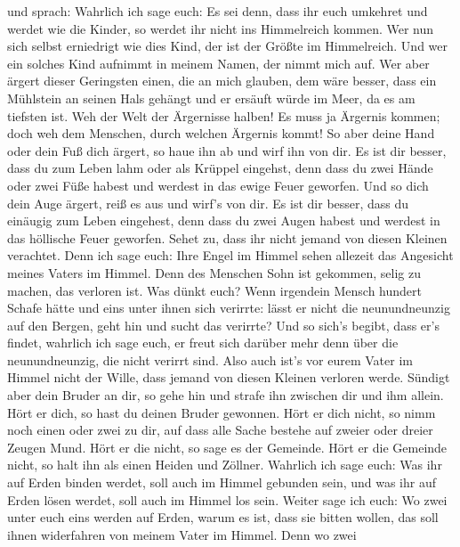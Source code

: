  und sprach: Wahrlich ich sage euch: Es sei denn, dass ihr
euch umkehret und werdet wie die Kinder, so werdet ihr nicht ins
Himmelreich kommen.  Wer nun sich selbst erniedrigt wie dies
Kind, der ist der Größte im Himmelreich.  Und wer ein
solches Kind aufnimmt in meinem Namen, der nimmt mich auf. 
Wer aber ärgert dieser Geringsten einen, die an mich glauben, dem wäre
besser, dass ein Mühlstein an seinen Hals gehängt und er ersäuft würde
im Meer, da es am tiefsten ist.  Weh der Welt der Ärgernisse
halben! Es muss ja Ärgernis kommen; doch weh dem Menschen, durch welchen
Ärgernis kommt!  So aber deine Hand oder dein Fuß dich
ärgert, so haue ihn ab und wirf ihn von dir. Es ist dir besser, dass du
zum Leben lahm oder als Krüppel eingehst, denn dass du zwei Hände oder
zwei Füße habest und werdest in das ewige Feuer geworfen. 
Und so dich dein Auge ärgert, reiß es aus und wirf's von dir. Es ist dir
besser, dass du einäugig zum Leben eingehest, denn dass du zwei Augen
habest und werdest in das höllische Feuer geworfen.  Sehet
zu, dass ihr nicht jemand von diesen Kleinen verachtet. Denn ich sage
euch: Ihre Engel im Himmel sehen allezeit das Angesicht meines Vaters im
Himmel.  Denn des Menschen Sohn ist gekommen, selig zu
machen, das verloren ist.  Was dünkt euch? Wenn irgendein
Mensch hundert Schafe hätte und eins unter ihnen sich verirrte: lässt er
nicht die neunundneunzig auf den Bergen, geht hin und sucht das
verirrte?  Und so sich's begibt, dass er's findet, wahrlich
ich sage euch, er freut sich darüber mehr denn über die neunundneunzig,
die nicht verirrt sind.  Also auch ist's vor eurem Vater im
Himmel nicht der Wille, dass jemand von diesen Kleinen verloren werde.
 Sündigt aber dein Bruder an dir, so gehe hin und strafe
ihn zwischen dir und ihm allein. Hört er dich, so hast du deinen Bruder
gewonnen.  Hört er dich nicht, so nimm noch einen oder zwei
zu dir, auf dass alle Sache bestehe auf zweier oder dreier Zeugen Mund.
 Hört er die nicht, so sage es der Gemeinde. Hört er die
Gemeinde nicht, so halt ihn als einen Heiden und Zöllner. 
Wahrlich ich sage euch: Was ihr auf Erden binden werdet, soll auch im
Himmel gebunden sein, und was ihr auf Erden lösen werdet, soll auch im
Himmel los sein.  Weiter sage ich euch: Wo zwei unter euch
eins werden auf Erden, warum es ist, dass sie bitten wollen, das soll
ihnen widerfahren von meinem Vater im Himmel.  Denn wo zwei
